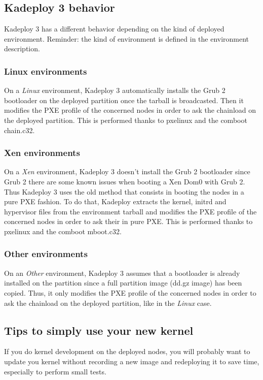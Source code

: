 \documentclass[a4wide,10pt,oneside]{book}
\begin{document}
\subsection{Kadeploy 3 behavior}
Kadeploy 3 has a different behavior depending on the kind of deployed environment. Reminder: the kind of environment is defined in the environment description.

\subsubsection{Linux environments}
On a \emph{Linux} environment, Kadeploy 3 automatically installs the Grub 2 bootloader on the deployed partition once the tarball is broadcasted. Then it modifies the PXE profile of the concerned nodes in order to ask the chainload on the deployed partition. This is performed thanks to pxelinux and the comboot chain.c32.

\subsubsection{Xen environments}
On a \emph{Xen} environment, Kadeploy 3 doesn't install the Grub 2 bootloader since Grub 2 there are some known issues when booting a Xen Dom0 with Grub 2. Thus Kadeploy 3 uses the old method that consists in booting the nodes in a pure PXE fashion. To do that, Kadeploy extracts the kernel, initrd and hypervisor files from the environment tarball and modifies the PXE profile of the concerned nodes in order to ask their in pure PXE. This is performed thanks to pxelinux and the comboot mboot.c32.

\subsubsection{Other environments}
On an \emph{Other} environment, Kadeploy 3 assumes that a bootloader is already installed on the partition since a full partition image (dd.gz image) has been copied. Thus, it only modifies the PXE profile of the concerned nodes in order to ask the chainload on the deployed partition, like in the \emph{Linux} case.

\subsection{Tips to simply use your new kernel}
If you do kernel development on the deployed nodes, you will probably want to update you kernel without recording a new image and redeploying it to save time, especially to perform small tests.
\end{document}
